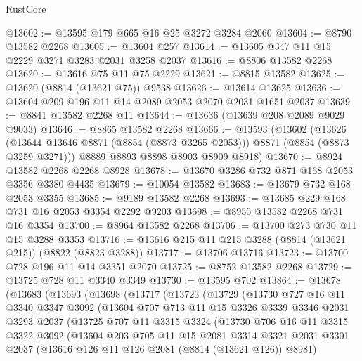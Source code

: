 \begin{lexlean}{RustCore}
\begin{coremodule}
@13602 := @13595 @179 @665 @16 @25 @3272 @3284 @2060
@13604 := @8790 @13582 @2268
@13605 := @13604 @257
@13614 := @13605 @347 @11 @15 @2229 @3271 @3283 @2031 @3258 @2037
@13616 := @8806 @13582 @2268
@13620 := @13616 @75 @11 @75 @2229
@13621 := @8815 @13582
@13625 := @13620 (@8814 (@13621 @75)) @9538
@13626 := @13614 @13625
@13636 := @13604 @209 @196 @11 @14 @2089 @2053 @2070 @2031 @1651 @2037
@13639 := @8841 @13582 @2268 @11
@13644 := @13636 (@13639 @208 @2089 @9029 @9033)
@13646 := @8865 @13582 @2268
@13666 := @13593
    (@13602
      (@13626 (@13644 @13646 @8871 (@8854 (@8873 @3265 @2053))) @8871 (@8854 (@8873 @3259 @3271)))
      @8889
      @8893
      @8898
      @8903
      @8909
      @8918)
@13670 := @8924 @13582 @2268 @2268 @8928
@13678 := @13670 @3286 @732 @871 @168 @2053 @3356 @3380 @4435
@13679 := @10054 @13582
@13683 := @13679 @732 @168 @2053 @3355
@13685 := @9189 @13582 @2268
@13693 := @13685 @229 @168 @731 @16 @2053 @3354 @2292 @9203
@13698 := @8955 @13582 @2268 @731 @16 @3354
@13700 := @8964 @13582 @2268
@13706 := @13700 @273 @730 @11 @15 @3288 @3353
@13716 := @13616 @215 @11 @215 @3288 (@8814 (@13621 @215)) (@8822 (@8823 @3288))
@13717 := @13706 @13716
@13723 := @13700 @728 @196 @11 @14 @3351 @2070
@13725 := @8752 @13582 @2268
@13729 := @13725 @728 @11 @3340 @3349
@13730 := @13595 @702
@13864 := @13678
    (@13683
      (@13693
        (@13698
          (@13717
            (@13723
              (@13729
                (@13730
                  @727
                  @16
                  @11
                  @3340
                  @3347
                  @3092
                  (@13604
                    @707
                    @713
                    @11
                    @15
                    @3326
                    @3339
                    @3346
                    @2031
                    @3293
                    @2037
                    (@13725
                      @707
                      @11
                      @3315
                      @3324
                      (@13730
                        @706
                        @16
                        @11
                        @3315
                        @3322
                        @3092
                        (@13604
                          @203
                          @705
                          @11
                          @15
                          @2081
                          @3314
                          @3321
                          @2031
                          @3301
                          @2037
                          (@13616 @126 @11 @126 @2081 (@8814 (@13621 @126)) @8981)

\end{coremodule}
\end{lexlean}
